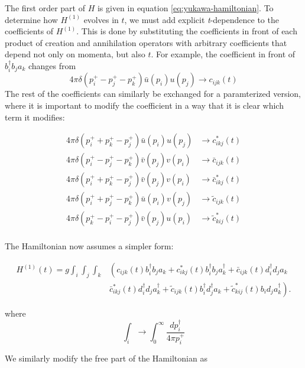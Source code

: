 The first order part of $H$ is given in equation \ref{eq:yukawa-hamiltonian}.
To determine how $H^{(1)}$ evolves in $t$, we must add explicit \textit{t}-dependence to the coefficients of $H^{(1)}$.
This is done by substituting the coefficients in front of each product of creation and annihilation operators with arbitrary coefficients that depend not only on momenta, but also $t$. 
For example, the coefficient in front of $b_i^\dagger b_j a_k$ changes from $$4\pi \delta\left(p_i^+ - p_j^+ - p_k^+ \right)\bar u(p_i) u(p_j) \rightarrow c_{ijk}(t)$$  
The rest of the coefficients can similarly be exchanged for a paramterized version, where it is important to modify the coefficient in a way that it is clear which term it modifies:

\begin{align}\nonumber
    4\pi \delta\left(p_i^+ + p_k^+ - p_j^+ \right)\bar{u}(p_i) u(p_j) &\rightarrow c^*_{ikj}(t)\\ \nonumber
    4\pi \delta\left(p_i^+ - p_j^+ - p_k^+ \right)\bar{v}(p_j) v(p_i) &\rightarrow \bar{c}_{ijk}(t) \\ \nonumber
    4\pi \delta\left(p_i^+ + p_k^+ - p_j^+ \right)\bar{v}(p_j) v(p_i) &\rightarrow \bar c^*_{ikj}(t)\\ \nonumber
    4\pi \delta\left(p_i^+ + p_j^+ - p_k^+ \right)\bar{u}(p_i) v(p_j) &\rightarrow \tilde c_{ijk}(t)\\ \nonumber
    4\pi \delta\left( p_k^+ - p_i^+ - p_j^+ \right)\bar{v}(p_j) u(p_i) &\rightarrow \tilde c^*_{kij}(t)\\ \nonumber
\end{align}

The Hamiltonian now assumes a simpler form:

\begin{align}
    \label{eq:H-first-order-c-coeffs}
    H^{(1)}(t) = g\int_i \int_j \int_k &\left(c_{ijk}(t)b_i^\dagger b_j a_k + c_{ikj}^*(t) b_i^\dagger b_j a_k^\dagger + \bar c_{ijk}(t) d_i^\dagger d_j a_k \right. \\ \nonumber
    & \left. \bar c^*_{ikj}(t) d^\dagger_i d_j a_k^\dagger + \tilde c_{ijk}(t)b_i^\dagger d_j^\dagger a_k + \tilde c^*_{kij}(t) b_i d_j a_k^\dagger \right).
\end{align}

where
\begin{equation}
    \int_i \rightarrow \int_0^\infty \frac{dp_i^\dagger}{4\pi p_i^+}
\end{equation}

We similarly modify the free part of the Hamiltonian as

